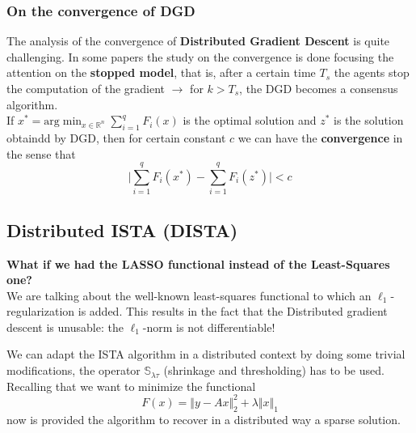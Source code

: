 {\color{blue}
\subsubsection*{On the convergence of DGD}
}
\noindent
The analysis of the convergence of \textbf{Distributed Gradient Descent} is quite challenging. In some papers the study on the convergence is done focusing the attention on the \textbf{stopped model}, that is, after a certain time $T_s$ the agents stop the computation of the gradient $\longrightarrow$ for $k>T_s$, the DGD becomes a consensus algorithm. \\
If $x^*= \text{arg}\min_{x\in\mathbb{R}^n} \sum_{i=1}^q F_i(x)$ is the optimal solution and $z^*$ is the solution obtaindd by DGD, then for certain constant $c$ we can have the \textbf{convergence} in the sense that
\begin{equation*}
    \bigg\vert \sum_{i=1}^q F_i(x^*) - \sum_{i=1}^q F_i(z^*)\bigg\vert < c
\end{equation*}

\subsection{Distributed ISTA (DISTA)}
{\color{cyan}
\textbf{What if we had the LASSO functional instead of the Least-Squares one?}
}
\\
We are talking about the well-known least-squares functional to which an $\ell_1$-regularization is added. This results in the fact that the Distributed gradient descent is unusable: the $\ell_1$-norm is not differentiable! 

We can adapt the ISTA algorithm in a distributed context by doing some trivial modifications, the operator $\mathbb{S}_{\lambda\tau}$ (shrinkage and thresholding) has to be used. Recalling that we want to minimize the functional 
\begin{equation*}
    F(x)=\Vert y-Ax \Vert_2^2 + \lambda \Vert x \Vert_1
\end{equation*}
now is provided the algorithm to recover in a distributed way a sparse solution. 


